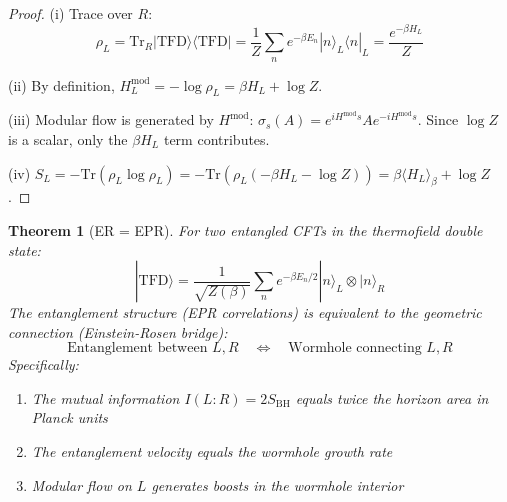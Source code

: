\documentclass[12pt,a4paper]{article}
\newtheorem{theorem}{Theorem}[section]
\begin{document}
\begin{proof}
(i) Trace over $R$:
\begin{equation}
\rho_L = \text{Tr}_R |\text{TFD}\rangle\langle\text{TFD}| = \frac{1}{Z} \sum_n e^{-\beta E_n} |n\rangle_L \langle n|_L = \frac{e^{-\beta H_L}}{Z}
\end{equation}

(ii) By definition, $H_L^{\text{mod}} = -\log\rho_L = \beta H_L + \log Z$.

(iii) Modular flow is generated by $H^{\text{mod}}$: $\sigma_s(A) = e^{iH^{\text{mod}}s} A e^{-iH^{\text{mod}}s}$. Since $\log Z$ is a scalar, only the $\beta H_L$ term contributes.

(iv) $S_L = -\text{Tr}(\rho_L \log\rho_L) = -\text{Tr}(\rho_L(-\beta H_L - \log Z)) = \beta \langle H_L \rangle_\beta + \log Z$.
\end{proof}

\begin{theorem}[ER = EPR]\label{thm:er-epr}
For two entangled CFTs in the thermofield double state:
\begin{equation}
|\text{TFD}\rangle = \frac{1}{\sqrt{Z(\beta)}} \sum_n e^{-\beta E_n/2} |n\rangle_L \otimes |n\rangle_R
\end{equation}
The entanglement structure (EPR correlations) is equivalent to the geometric connection (Einstein-Rosen bridge):
\begin{equation}
\text{Entanglement between }L, R \quad \Longleftrightarrow \quad \text{Wormhole connecting }L, R
\end{equation}
Specifically:
\begin{enumerate}
    \item The mutual information $I(L:R) = 2S_{\text{BH}}$ equals twice the horizon area in Planck units
    \item The entanglement velocity equals the wormhole growth rate
    \item Modular flow on $L$ generates boosts in the wormhole interior
\end{enumerate}
\end{theorem}
\end{document}
